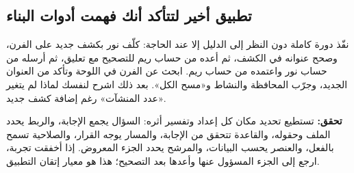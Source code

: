 \subsection{تطبيق أخير لتتأكد أنك فهمت أدوات البناء}

نفّذ دورة كاملة دون النظر إلى الدليل إلا عند الحاجة: كلّف نور بكشف جديد على الفرن، وصحح عنوانه في الكشف، ثم أعده من حساب ريم للتصحيح مع تعليق، ثم أرسله من حساب نور واعتمده من حساب ريم. ابحث عن الفرن في اللوحة وتأكد من العنوان الجديد، وجرّب المحافظة والنشاط و«مسح الكل». بعد ذلك اشرح لنفسك لماذا لم يتغير «عدد المنشآت» رغم إضافة كشف جديد.

\textbf{تحقق:} تستطيع تحديد مكان كل إعداد وتفسير أثره: السؤال يجمع الإجابة، والربط يحدد الملف وحقوله، والقاعدة تتحقق من الإجابة، والمسار يوجه القرار، والصلاحية تسمح بالفعل، والعنصر يحسب البيانات، والمرشح يحدد الجزء المعروض. إذا أخفقت تجربة، ارجع إلى الجزء المسؤول عنها وأعدها بعد التصحيح؛ هذا هو معيار إتقان التطبيق.
